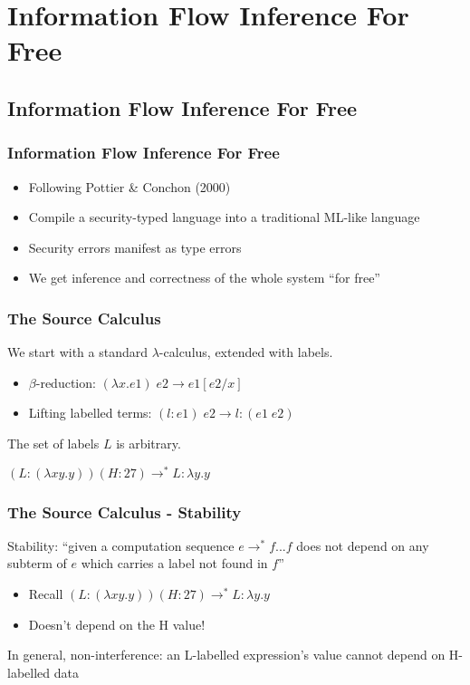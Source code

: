 \documentclass{beamer}
\begin{document}
\section{Information Flow Inference For Free}
\subsection{Information Flow Inference For Free}
\begin{frame}
  \frametitle{Information Flow Inference For Free}
  \begin{itemize}
    \item Following Pottier \& Conchon (2000)
    \pause
    \item Compile a security-typed language into a traditional ML-like language
    \pause
    \item Security errors manifest as type errors
    \pause
    \item We get inference and correctness of the whole system ``for free''
  \end{itemize}
\end{frame}
\begin{frame}
  \frametitle{The Source Calculus}
  We start with a standard $\lambda$-calculus, extended with labels.
  \pause
  \begin{itemize}
    \item $\beta$-reduction: $(\lambda x. e1)\; e2 \rightarrow e1[e2/x]$
    \item Lifting labelled terms: $(l : e1)\; e2 \rightarrow l : (e1\; e2)$
  \end{itemize}
  The set of labels $L$ is arbitrary.
  \pause
  \begin{example}
    $(L : (\lambda x y. y)) (H : 27) \rightarrow^* L : \lambda y. y$
  \end{example}
\end{frame}
\begin{frame}
  \frametitle{The Source Calculus - Stability}
  \begin{theorem}
  Stability: ``given a computation sequence $e \rightarrow^* f$...$f$ does not
               depend on any subterm of $e$ which carries a label not found
               in $f$''
  \end{theorem}
  \pause
  \begin{example}
    \begin{itemize}
      \item Recall $(L : (\lambda x y. y)) (H : 27) \rightarrow^*
                     L : \lambda y. y$
      \pause
      \item Doesn't depend on the H value!
    \end{itemize}
  \end{example}
  \pause
  In general, non-interference: an L-labelled expression's value
  cannot depend on H-labelled data
\end{frame}
\end{document}
